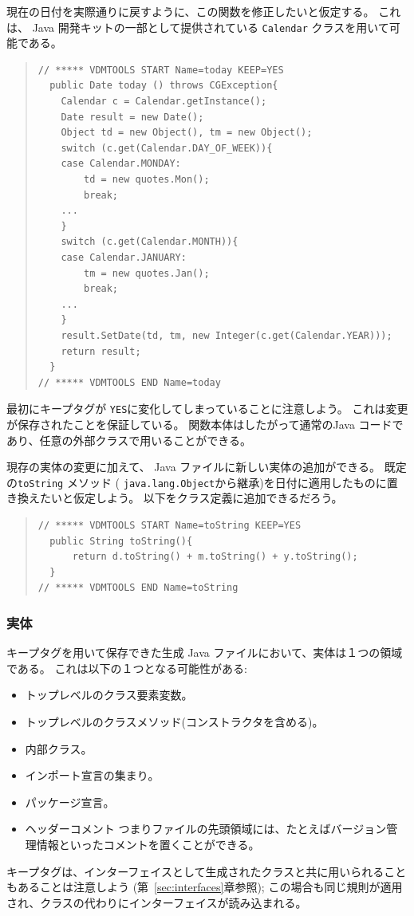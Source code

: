 \documentclass[\pformat,11pt]{jarticle}
\begin{document}
現在の日付を実際通りに戻すように、この関数を修正したいと仮定する。
これは、 Java 開発キットの一部として提供されている \texttt{Calendar} クラスを用いて可能である。
\begin{quote}
\begin{verbatim}
// ***** VDMTOOLS START Name=today KEEP=YES
  public Date today () throws CGException{
    Calendar c = Calendar.getInstance();
    Date result = new Date();
    Object td = new Object(), tm = new Object();
    switch (c.get(Calendar.DAY_OF_WEEK)){
    case Calendar.MONDAY:
        td = new quotes.Mon();
        break;
    ...
    }
    switch (c.get(Calendar.MONTH)){
    case Calendar.JANUARY:
        tm = new quotes.Jan();
        break;
    ...
    }
    result.SetDate(td, tm, new Integer(c.get(Calendar.YEAR)));
    return result;
  }
// ***** VDMTOOLS END Name=today
\end{verbatim}
\end{quote}
最初にキープタグが \texttt{YES}に変化してしまっていることに注意しよう。
これは変更が保存されたことを保証している。
関数本体はしたがって通常のJava コードであり、任意の外部クラスで用いることができる。

現存の実体の変更に加えて、 Java ファイルに新しい実体の追加ができる。
既定の\texttt{toString} メソッド ( \texttt{java.lang.Object}から継承)を日付に適用したものに置き換えたいと仮定しよう。
以下をクラス定義に追加できるだろう。
\begin{quote}
\begin{verbatim}
// ***** VDMTOOLS START Name=toString KEEP=YES
  public String toString(){
      return d.toString() + m.toString() + y.toString();
  }
// ***** VDMTOOLS END Name=toString
\end{verbatim}
\end{quote}

\subsubsection{実体}

キープタグを用いて保存できた生成 Java ファイルにおいて、実体は１つの領域である。
これは以下の１つとなる可能性がある:
\begin{itemize}
\item トップレベルのクラス要素変数。
\item トップレベルのクラスメソッド(コンストラクタを含める)。
\item 内部クラス。
\item インポート宣言の集まり。
\item パッケージ宣言。
\item ヘッダーコメント つまりファイルの先頭領域には、たとえばバージョン管理情報といったコメントを置くことができる。
\end{itemize}
キープタグは、インターフェイスとして生成されたクラスと共に用いられることもあることは注意しよう (第~\ref{sec:interfaces}章参照); この場合も同じ規則が適用され、クラスの代わりにインターフェイスが読み込まれる。
\end{document}
